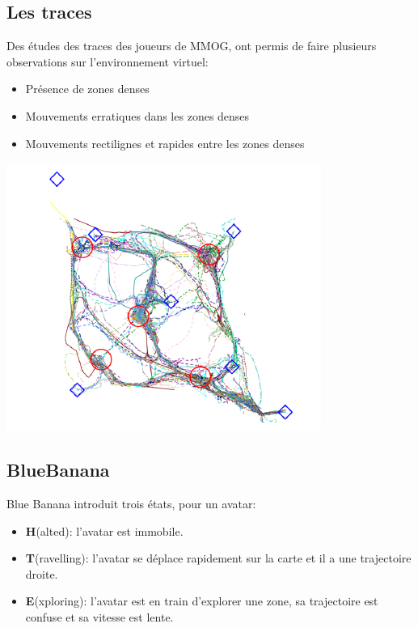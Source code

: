 \documentclass{beamer}
\begin{document}
  \subsection{Les traces}
  \begin{frame}
	Des études des traces des joueurs de MMOG, ont permis de faire plusieurs observations sur l'environnement virtuel:
	\begin{itemize}
		\item Présence de zones denses 
		\item Mouvements erratiques dans les zones denses
		\item Mouvements rectilignes et rapides entre les zones denses
	\end{itemize}
	\begin{center}
        \includegraphics[scale=0.35]{./Ressources/Images/trace.png}\\
        \end{center}
  \end{frame}

  \subsection{BlueBanana}
  \begin{frame}
	 Blue Banana introduit trois états, pour un avatar:
        \begin{itemize}
                \item \textbf{H}(alted): l'avatar est immobile.
                \item \textbf{T}(ravelling): l'avatar se déplace rapidement sur la carte et il a une trajectoire droite.
                \item \textbf{E}(xploring): l'avatar est en train d'explorer une zone, sa trajectoire est confuse et sa vitesse est lente.
        \end{itemize}
  \end{frame}
\end{document}
